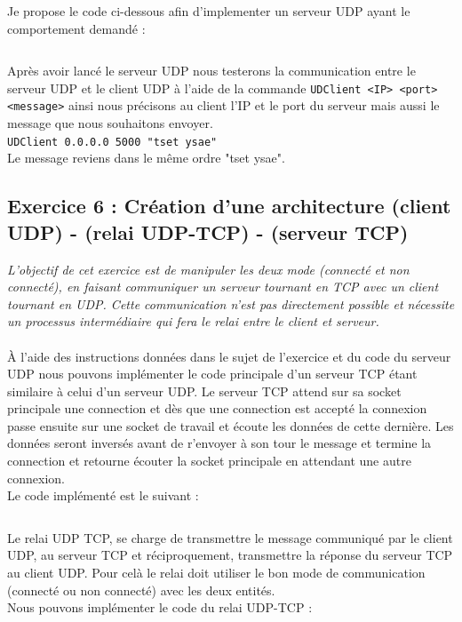 Je propose le code ci-dessous afin d'implementer un serveur UDP ayant le comportement demandé :
\inputminted[linenos,firstline=33,lastline=114]{cpp}{../sources/cpp/TP7-8/serveurUDP.c}

Après avoir lancé le serveur UDP nous testerons la communication entre le serveur UDP et le client UDP à l'aide de la commande \texttt{UDClient <IP> <port> <message>} ainsi nous précisons au client l'IP et le port du serveur mais aussi le message que nous souhaitons envoyer.\\
\texttt{UDClient 0.0.0.0 5000 "tset ysae"}\\
Le message reviens dans le même ordre "tset ysae".

\subsection{Exercice 6 : Création d’une architecture (client UDP) - (relai UDP-TCP) - (serveur TCP)}

\textit{L'objectif de cet exercice est de manipuler les deux mode (connecté et non connecté), en faisant communiquer un serveur tournant en TCP avec un client tournant en UDP. Cette communication n’est pas directement possible et nécessite un processus intermédiaire qui fera le relai entre le client et serveur.}
\\\\
À l'aide des instructions données dans le sujet de l'exercice et du code du serveur UDP nous pouvons implémenter le code principale d'un serveur TCP étant similaire à celui d'un serveur UDP. Le serveur TCP attend sur sa socket principale une connection et dès que une connection est accepté la connexion passe ensuite sur une socket de travail et écoute les données de cette dernière. Les données seront inversés avant de r'envoyer à son tour le message et termine la connection et retourne écouter la socket principale en attendant une autre connexion.\\
Le code implémenté est le suivant :
\inputminted[linenos, firstline=26,lastline=117]{cpp}{../sources/cpp/TP7-8/serveurTCP.c}

Le relai UDP TCP, se charge de transmettre le message communiqué par le client UDP, au serveur TCP et réciproquement, transmettre la réponse du serveur TCP au client UDP. Pour celà le relai doit utiliser le bon mode de communication (connecté ou non connecté) avec les deux entités.\\
Nous pouvons implémenter le code du relai UDP-TCP :
\inputminted[linenos, firstline=14,lastline=122]{cpp}{../sources/cpp/TP7-8/relaiUDPTCP.c}

